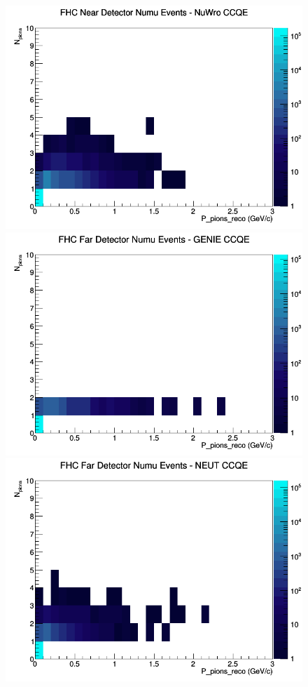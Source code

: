 \documentclass[12pt]{article}
\begin{document}
\begin{figure}[h]
\includegraphics[width=\linewidth]{eff_N_P/FGT/pions/CCQE_FHC_ND_numu_N_P_NuWro.png}
\endminipage
\newline
{}
\includegraphics[width=\linewidth]{eff_N_P/FGT/pions/CCQE_FHC_FD_numu_N_P_GENIE.png}
\endminipage
{}
\includegraphics[width=\linewidth]{eff_N_P/FGT/pions/CCQE_FHC_FD_numu_N_P_NEUT.png}

\end{figure}
\end{document}
